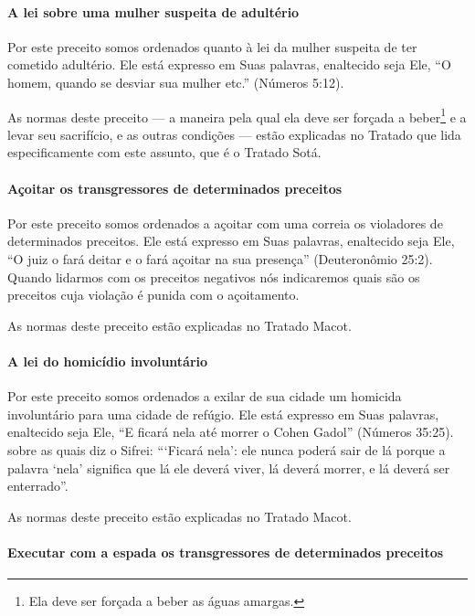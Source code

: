 \paragraph{A lei sobre uma mulher suspeita de adultério}

Por este preceito somos ordenados quanto à lei da mulher suspeita de ter
cometido adultério. Ele está expresso em Suas palavras, enaltecido seja Ele,
``O homem, quando se desviar sua mulher etc.'' (Números 5:12).

As normas deste preceito --- a maneira pela qual ela deve ser forçada a
beber\footnote{Ela deve ser forçada a beber as águas amargas.} e a levar seu sacrifício, e as outras
condições --- estão explicadas no Tratado que lida especificamente com
este assunto, que é o Tratado Sotá.

\paragraph{Açoitar os transgressores de determinados preceitos}

Por este preceito somos ordenados a açoitar com uma correia os
violadores de determinados preceitos. Ele está expresso em Suas
palavras, enaltecido seja Ele, ``O juiz o fará deitar e o fará açoitar
na sua presença'' (Deuteronômio 25:2). Quando lidarmos com os preceitos
negativos nós indicaremos quais são os preceitos cuja violação é punida
com o açoitamento.

As normas deste preceito estão explicadas no Tratado Macot.

\paragraph{A lei do homicídio involuntário}

Por este preceito somos ordenados a exilar de sua cidade um homicida
involuntário para uma cidade de refúgio. Ele está expresso em Suas
palavras, enaltecido seja Ele, ``E ficará nela até morrer o Cohen
Gadol'' (Números 35:25). sobre as quais diz o Sifrei: ```Ficará nela':
ele nunca poderá sair de lá porque a palavra `nela' significa que lá ele
deverá viver, lá deverá morrer, e lá deverá ser enterrado''.

As normas deste preceito estão explicadas no Tratado Macot.

\paragraph{Executar com a espada os transgressores de determinados preceitos}

